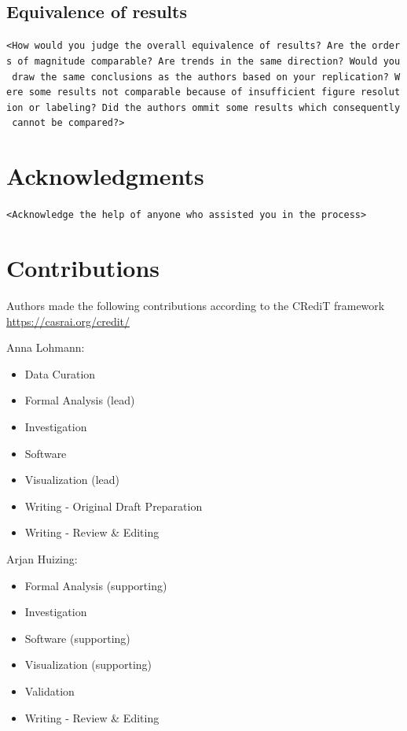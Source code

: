 \documentclass[10,a4paperpaper,]{article}
\begin{document}
\subsection{Equivalence of results}

\texttt{\textless{}How\ would\ you\ judge\ the\ overall\ equivalence\ of\ results?\ Are\ the\ orders\ of\ magnitude\ comparable?\ Are\ trends\ in\ the\ same\ direction?\ Would\ you\ draw\ the\ same\ conclusions\ as\ the\ authors\ based\ on\ your\ replication?\ Were\ some\ results\ not\ comparable\ because\ of\ insufficient\ figure\ resolution\ or\ labeling?\ Did\ the\ authors\ ommit\ some\ results\ which\ consequently\ cannot\ be\ compared?\textgreater{}}

\section{Acknowledgments}

\texttt{\textless{}Acknowledge\ the\ help\ of\ anyone\ who\ assisted\ you\ in\ the\ process\textgreater{}}

\section{Contributions}

Authors made the following contributions according to the CRediT
framework \url{https://casrai.org/credit/}

Anna Lohmann:

\begin{itemize}
\tightlist
\item
  Data Curation\\
\item
  Formal Analysis (lead)\\
\item
  Investigation\\
\item
  Software\\
\item
  Visualization (lead)\\
\item
  Writing - Original Draft Preparation\\
\item
  Writing - Review \& Editing
\end{itemize}

Arjan Huizing:

\begin{itemize}
\tightlist
\item
  Formal Analysis (supporting)\\
\item
  Investigation\\
\item
  Software (supporting)\\
\item
  Visualization (supporting)\\
\item
  Validation\\
\item
  Writing - Review \& Editing
\end{itemize}
\end{document}
